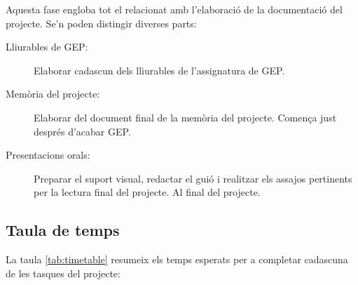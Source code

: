Aquesta fase engloba tot el relacionat amb l'elaboració de la documentació del projecte. Se'n poden distingir diverses parts:

\begin{description}
    \item[Lliurables de GEP:]{Elaborar cadascun dels lliurables de l'assignatura de GEP.}
    \item[Memòria del projecte:]{Elaborar del document final de la memòria del projecte. Comença just després d'acabar GEP.}
    \item[Presentacions orals:]{Preparar el suport visual, redactar el guió i realitzar els assajos pertinents per la lectura final del projecte. Al final del projecte.}
\end{description}



\subsection{Taula de temps}

La taula \ref{tab:timetable} resumeix els temps esperats per a completar cadascuna de les tasques del projecte:

